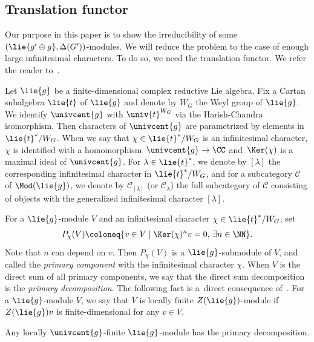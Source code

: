 \subsection{Translation functor}

Our purpose in this paper is to show the irreducibility of some $(\lie{g'\oplus g}, \Delta(G'))$-modules.
We will reduce the problem to the case of enough large infinitesimal characters.
To do so, we need the translation functor.
We refer the reader to~\cite[Chapter~VII]{KnVo95_cohomological_induction}.

Let $\lie{g}$ be a finite-dimensional complex reductive Lie algebra.
Fix a Cartan subalgebra $\lie{t}$ of $\lie{g}$ and denote by $W_G$ the Weyl group of $\lie{g}$.
We identify $\univcent{g}$ with $\univ{t}^{W_G}$ via the Harish-Chandra isomorphism.
Then characters of $\univcent{g}$ are parametrized by elements in $\lie{t}^*/W_G$.
When we say that $\chi \in \lie{t}^* / W_G$ is an infinitesimal character,
$\chi$ is identified with a homomorphism~${\univcent{g}\rightarrow \CC}$
and~$\Ker(\chi)$ is a maximal ideal of $\univcent{g}$.
For $\lambda \in \lie{t}^*$, we denote by $[\lambda]$ the corresponding infinitesimal character in $\lie{t}^*/W_G$,
and for a subcategory $\mathcal{C}$ of $\Mod(\lie{g})$, we denote by $\mathcal{C}_{[\lambda]}$ (or $\mathcal{C}_\lambda$) the full subcategory of $\mathcal{C}$ consisting of objects with the generalized infinitesimal character $[\lambda]$.

For a $\lie{g}$-module $V$ and an infinitesimal character $\chi \in \lie{t}^*/W_G$, set
\begin{align*}
	P_{\chi}(V) \coloneq \{v \in V \mid \Ker(\chi)^n v = 0, \, \exists n \in \NN\}.
\end{align*}
Note that $n$ can depend on $v$.
Then $P_{\chi}(V)$ is a $\lie{g}$-submodule of $V$, and called the \emph{primary component} with the infinitesimal character $\chi$.
When $V$ is the direct sum of all primary components, we say that the direct sum decomposition is the \emph{primary decomposition}.
The following fact is a~direct consequence of~\cite[Proposition~7.20]{KnVo95_cohomological_induction}.
For a $\lie{g}$-module $V$, we say that $V$ is locally finite $Z(\lie{g})$-module if $Z(\lie{g})v$ is finite-dimensional for any $v \in V$.

\begin{Fact}\label{fact:PrimaryDecomposition}
	Any locally $\univcent{g}$-finite $\lie{g}$-module has the primary decomposition.
\end{Fact}


